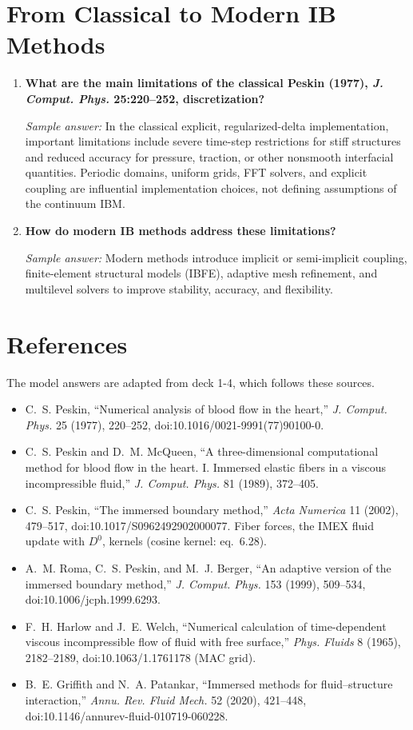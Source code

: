 \documentclass[11pt]{article}
\begin{document}
\section*{From Classical to Modern IB Methods}

\begin{enumerate}[label=\arabic*., resume]

\item \textbf{What are the main limitations of the classical Peskin (1977), \emph{J. Comput. Phys.} 25:220--252, discretization?}

\textit{Sample answer:}  
In the classical explicit, regularized-delta implementation, important limitations include severe time-step restrictions for stiff structures and reduced accuracy for pressure, traction, or other nonsmooth interfacial quantities. Periodic domains, uniform grids, FFT solvers, and explicit coupling are influential implementation choices, not defining assumptions of the continuum IBM.

\item \textbf{How do modern IB methods address these limitations?}

\textit{Sample answer:}  
Modern methods introduce implicit or semi-implicit coupling, finite-element structural models (IBFE), adaptive mesh refinement, and multilevel solvers to improve stability, accuracy, and flexibility.

\end{enumerate}

\section*{References}
\sloppy

The model answers are adapted from deck 1-4, which follows these sources.
\begin{itemize}
\item C.~S. Peskin, ``Numerical analysis of blood flow in the heart,'' \emph{J. Comput. Phys.} 25 (1977), 220--252, doi:10.1016/0021-9991(77)90100-0.
\item C.~S. Peskin and D.~M. McQueen, ``A three-dimensional computational method for blood flow in the heart. I. Immersed elastic fibers in a viscous incompressible fluid,'' \emph{J. Comput. Phys.} 81 (1989), 372--405.
\item C.~S. Peskin, ``The immersed boundary method,'' \emph{Acta Numerica} 11 (2002), 479--517, doi:10.1017/S0962492902000077. Fiber forces, the IMEX fluid update with $D^0$, kernels (cosine kernel: eq.~6.28).
\item A.~M. Roma, C.~S. Peskin, and M.~J. Berger, ``An adaptive version of the immersed boundary method,'' \emph{J. Comput. Phys.} 153 (1999), 509--534, doi:10.1006/jcph.1999.6293.
\item F.~H. Harlow and J.~E. Welch, ``Numerical calculation of time-dependent viscous incompressible flow of fluid with free surface,'' \emph{Phys. Fluids} 8 (1965), 2182--2189, doi:10.1063/1.1761178 (MAC grid).
\item B.~E. Griffith and N.~A. Patankar, ``Immersed methods for fluid--structure interaction,'' \emph{Annu. Rev. Fluid Mech.} 52 (2020), 421--448, doi:10.1146/annurev-fluid-010719-060228.
\end{itemize}
\end{document}
